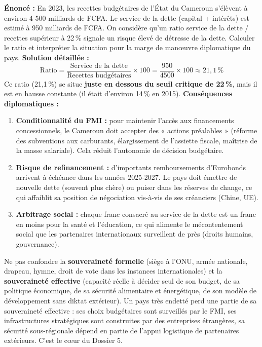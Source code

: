 \documentclass[11pt]{article}
\begin{document}
\begin{exoresolu}
\textbf{Énoncé :} En 2023, les recettes budgétaires de l'État du Cameroun s'élèvent à environ 4 500 milliards de FCFA. Le service de la dette (capital + intérêts) est estimé à 950 milliards de FCFA. On considère qu'un ratio service de la dette / recettes supérieur à 22\,\% signale un risque élevé de détresse de la dette. Calculer le ratio et interpréter la situation pour la marge de manœuvre diplomatique du pays.
\tcblower
\textbf{Solution détaillée :}
\[
\text{Ratio} = \frac{\text{Service de la dette}}{\text{Recettes budgétaires}} \times 100 = \frac{950}{4500} \times 100 \approx 21,1\,\%
\]
Ce ratio (21,1\,\%) se situe \textbf{juste en dessous du seuil critique de 22\,\%}, mais il est en hausse constante (il était d'environ 14\,\% en 2015).
\textbf{Conséquences diplomatiques :}
\begin{enumerate}
    \item \textbf{Conditionnalité du FMI :} pour maintenir l'accès aux financements concessionnels, le Cameroun doit accepter des « actions préalables » (réforme des subventions aux carburants, élargissement de l'assiette fiscale, maîtrise de la masse salariale). Cela réduit l'autonomie de décision budgétaire.
    \item \textbf{Risque de refinancement :} d'importants remboursements d'Eurobonds arrivent à échéance dans les années 2025-2027. Le pays doit émettre de nouvelle dette (souvent plus chère) ou puiser dans les réserves de change, ce qui affaiblit sa position de négociation vis-à-vis de ses créanciers (Chine, UE).
    \item \textbf{Arbitrage social :} chaque franc consacré au service de la dette est un franc en moins pour la santé et l'éducation, ce qui alimente le mécontentement social que les partenaires internationaux surveillent de près (droits humains, gouvernance).
\end{enumerate}
\end{exoresolu}

\begin{attention}
Ne pas confondre la \textbf{souveraineté formelle} (siège à l'ONU, armée nationale, drapeau, hymne, droit de vote dans les instances internationales) et la \textbf{souveraineté effective} (capacité réelle à décider seul de son budget, de sa politique économique, de sa sécurité alimentaire et énergétique, de son modèle de développement sans diktat extérieur). Un pays très endetté perd une partie de sa souveraineté effective : ses choix budgétaires sont surveillés par le FMI, ses infrastructures stratégiques sont construites par des entreprises étrangères, sa sécurité sous-régionale dépend en partie de l'appui logistique de partenaires extérieurs. C'est le cœur du Dossier 5.
\end{attention}
\end{document}
